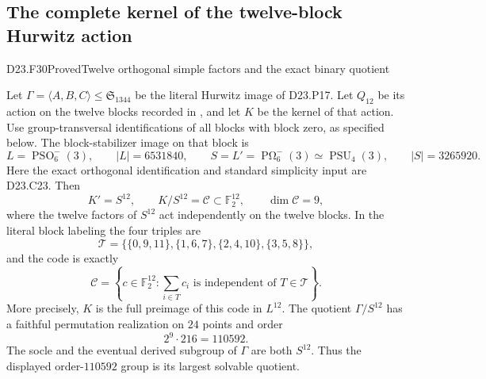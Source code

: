\subsection{The complete kernel of the twelve-block Hurwitz action}

\begin{statement}{D23.F30}{Proved}{Twelve orthogonal simple factors and the exact binary quotient}
\end{statement}
Let $\Gamma=\langle A,B,C\rangle\leq\mathfrak S_{1344}$ be
the literal Hurwitz image of D23.P17. Let $Q_{12}$ be its action
on the twelve blocks recorded in
,
and let $K$ be the kernel of that action. Use group-transversal
identifications of all blocks with block zero, as specified below.
The block-stabilizer image on that block is
\[
 L=\operatorname{PSO}_6^-(3),\qquad |L|=6531840,
 \qquad S=L'=\operatorname{P\Omega}_6^-(3)
              \simeq\operatorname{PSU}_4(3),
 \qquad |S|=3265920.
\]
Here the exact orthogonal identification and standard simplicity
input are D23.C23. Then
\[
 K'=S^{12},\qquad
 K/S^{12}=\mathcal C\subset\mathbb F_2^{12},\qquad
 \dim\mathcal C=9,
\]
where the twelve factors of $S^{12}$ act independently on the
twelve blocks. In the literal block labeling the four triples are
\[
 \mathcal T=\bigl\{
 \{0,9,11\},\{1,6,7\},\{2,4,10\},\{3,5,8\}\bigr\},
\]
and the code is exactly
\[
 \mathcal C=\left\{c\in\mathbb F_2^{12}:
           \sum_{i\in T}c_i\text{ is independent of }T\in\mathcal T
                              \right\}.
\]
More precisely, $K$ is the full preimage of this code in $L^{12}$.
The quotient $\Gamma/S^{12}$ has a faithful permutation
realization on $24$ points and order
\[
                         2^9\cdot216=110592.
\]
The socle and the eventual derived subgroup of $\Gamma$ are
both $S^{12}$. Thus the displayed order-$110592$ group is its
largest solvable quotient.

